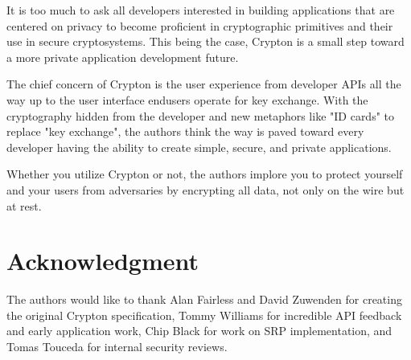 \documentclass[conference]{IEEEtran}
\begin{document}
It is too much to ask all developers interested in building applications that are
centered on privacy to become proficient in cryptographic primitives and their
use in secure cryptosystems. This being the case, Crypton is a small step
toward a more private application development future.

The chief concern of Crypton is the user experience from developer APIs
all the way up to the user interface endusers operate for key exchange. With the
cryptography hidden from the developer and new metaphors like "ID cards" to replace
"key exchange", the authors think the way is paved toward every developer having
the ability to create simple, secure, and private applications.

Whether you utilize Crypton or not, the authors implore you to protect yourself
and your users from adversaries by encrypting all data, not only on the wire but
at rest.

\section*{Acknowledgment}
The authors would like to thank Alan Fairless and David Zuwenden for creating the
original Crypton specification, Tommy Williams for incredible API feedback and
early application work, Chip Black for work on SRP implementation, and Tomas
Touceda for internal security reviews.
\end{document}
